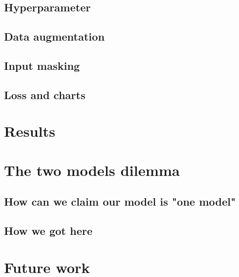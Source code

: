 \documentclass[runningheads]{llncs}
\begin{document}
\subsection{Hyperparameter}

\subsection{Data augmentation}

\subsection{Input masking}

\subsection{Loss and charts}

\section{Results}

\section{The two models dilemma}

\subsection{How can we claim our model is "one model"}
\subsection{How we got here}

\section{Future work}



\end{document}

